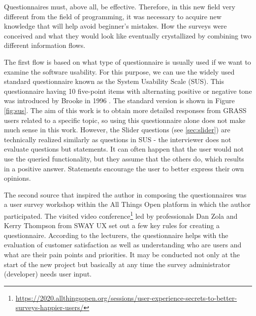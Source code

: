 \documentclass[a4paper,10pt,twoside]{article}
\begin{document}
Questionnaires must, above all, be effective. Therefore, in this new
field very different from the field of programming, it was necessary
to acquire new knowledge that will help avoid beginner's mistakes. How
the surveys were conceived and what they would look like eventually
crystallized by combining two different information flows.

The first flow is based on what type of questionnaire is usually used
if we want to examine the software usability. For this purpose, we can
use the widely used standard questionnaire known as the System
Usability Scale (SUS). This questionnaire having 10 five-point items
with alternating positive or negative tone was introduced by Brooke in
1996 \cite{sus}. The standard version is shown in Figure
\ref{fig:sus}. The aim of this work is to obtain more detailed
responses from GRASS users related to a specific topic, so using this
questionnaire alone does not make much sense in this work. However,
the Slider questions (see \ref{sec:slider}) are technically realized
similarly as questions in SUS - the interviewer does not evaluate
questions but statements. It can often happen that the user would not
use the queried functionality, but they assume that the others do,
which results in a positive answer. Statements encourage the user to
better express their own opinions.

The second source that inspired the author in composing the
questionnaires was a user survey workshop within the All Things Open
platform in which the author participated. The visited video
conference\footnote{\url{https://2020.allthingsopen.org/sessions/user-experience-secrets-to-better-surveys-happier-users/}}
led by professionals Dan Zola and Kerry Thompson from SWAY UX set out
a few key rules for creating a questionnaire. According to the
lecturers, the questionnaire helps with the evaluation of customer
satisfaction as well as understanding who are users and what are their
pain points and priorities. It may be conducted not only at the start
of the new project but basically at any time the survey administrator
(developer) needs user input.
\end{document}

